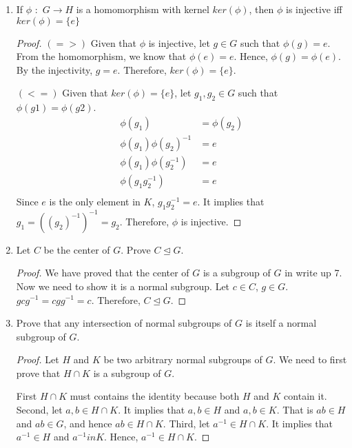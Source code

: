 \documentclass[12pt]{article}
\begin{document}
	\begin{enumerate}
		
		\item If $\phi$ $:$ $G\rightarrow H$ is a homomorphism with kernel $ker(\phi)$, then $\phi$ is injective iff $ker(\phi)=\{e\}$
		
		\begin{proof}
			$(=>)$  Given that $\phi$ is injective, let $g \in G$ such that $\phi(g) = e$. From the homomorphism, we know that $\phi(e) = e$. Hence, $\phi(g) = \phi(e)$. By the injectivity, $g=e$. Therefore, $ker(\phi) = \{e\}$.
			
			$(<=)$  Given that $ker(\phi) = \{e\}$, let $g_1, g_2 \in G$ such that $\phi(g1) = \phi(g2)$.			
			\begin{align*}
				\phi (g_1) &= \phi (g_2) \\
				\phi (g_1) \phi (g_2)^{-1} &= e\\
				\phi (g_1) \phi (g_2^{-1}) &= e\\
					\phi (g_1 g_2^{-1}) &= e\\
			\end{align*}			
			Since $e$ is the only element in $K$, $g_1 g_2^{-1} = e$. It implies that $g_1 = ((g_2)^{-1})^{-1} = g_2$. Therefore, $\phi$ is injective.
			
		\end{proof}
		
		
		
		\item Let $C$ be the center of $G$. Prove $C\unlhd G$.
		\begin{proof} 
		We have proved that the center of $G$ is a subgroup of $G$ in write up 7. Now we need to show it is a normal subgroup. Let $c \in C$, $g \in G$. $gcg^{-1} = cgg^{-1} = c$. Therefore, $C\unlhd G$.
			
		\end{proof}
		
		
		
		
		\item Prove that any intersection of normal subgroups of $G$ is itself a normal subgroup of $G$.
		
		\begin{proof}
			Let $H$ and $K$ be two arbitrary normal subgroups of $G$. We need to first prove that $H \cap K$ is a subgroup of $G$. 
			
			First $H \cap K$ must contains the identity because both $H$ and $K$ contain it. Second, let $a, b \in H \cap K$. It implies that $a,b \in H $ and $a,b \in K$. That is $ab \in H$ and $ab \in G$, and hence $ab \in H \cap K$. Third, let $a^{-1} \in H \cap K$. It implies that $ a^{-1} \in H$ and $a^{-1} in K$. Hence, $a^{-1} \in H \cap K$. 
		

\end{proof}
\end{enumerate}
\end{document}
